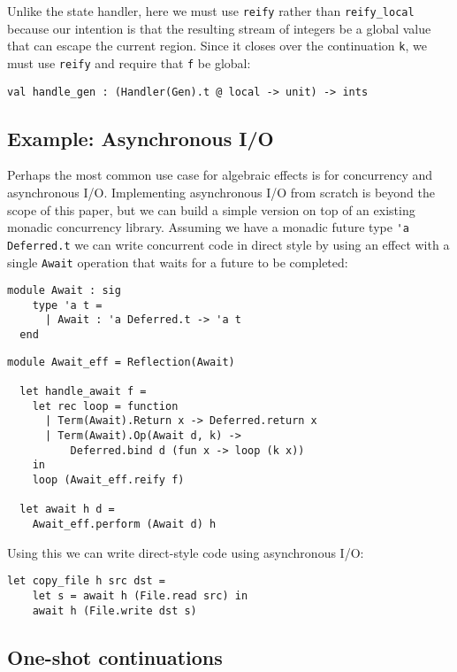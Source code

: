 \documentclass[acmsmall, screen, nonacm]{acmart}
\theoremstyle{definition}
\begin{document}
Unlike the state handler, here we must use
\lstinline[style=oxcaml]{reify} rather than
\lstinline[style=oxcaml]{reify_local} because our intention is that the
resulting stream of integers be a global value that can escape the
current region. Since it closes over the continuation
\lstinline[style=oxcaml]{k}, we must use \lstinline[style=oxcaml]{reify}
and require that \lstinline[style=oxcaml]{f} be global:
\begin{lstlisting}[style=oxcaml]
  val handle_gen : (Handler(Gen).t @ local -> unit) -> ints
\end{lstlisting}

\subsection{Example: Asynchronous I/O}

Perhaps the most common use case for algebraic effects is for
concurrency and asynchronous I/O. Implementing asynchronous I/O from
scratch is beyond the scope of this paper, but we can build a simple
version on top of an existing monadic concurrency library. Assuming we
have a monadic future type \lstinline[style=oxcaml]{'a Deferred.t} we can
write concurrent code in direct style by using an effect with a single
\lstinline[style=oxcaml]{Await} operation that waits for a future to be
completed:
\begin{lstlisting}[style=oxcaml]
  module Await : sig
    type 'a t =
      | Await : 'a Deferred.t -> 'a t
  end
\end{lstlisting}

\begin{lstlisting}[style=oxcaml]
  module Await_eff = Reflection(Await)

  let handle_await f =
    let rec loop = function
      | Term(Await).Return x -> Deferred.return x
      | Term(Await).Op(Await d, k) ->
          Deferred.bind d (fun x -> loop (k x))
    in
    loop (Await_eff.reify f)

  let await h d =
    Await_eff.perform (Await d) h
\end{lstlisting}

Using this we can write direct-style code using asynchronous I/O:
\begin{lstlisting}[style=oxcaml]
  let copy_file h src dst =
    let s = await h (File.read src) in
    await h (File.write dst s)
\end{lstlisting}

\subsection{One-shot continuations}
\end{document}
